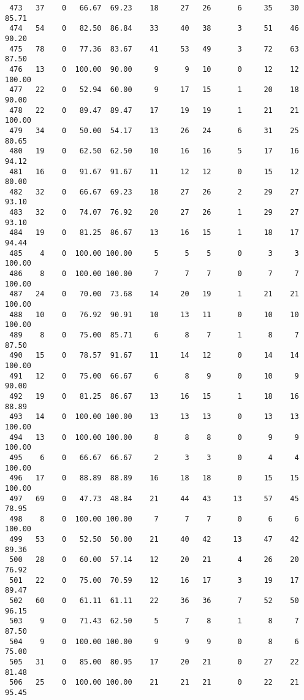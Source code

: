 \begin{verbatim}
 473   37    0   66.67  69.23    18     27   26      6     35    30    85.71
 474   54    0   82.50  86.84    33     40   38      3     51    46    90.20
 475   78    0   77.36  83.67    41     53   49      3     72    63    87.50
 476   13    0  100.00  90.00     9      9   10      0     12    12   100.00
 477   22    0   52.94  60.00     9     17   15      1     20    18    90.00
 478   22    0   89.47  89.47    17     19   19      1     21    21   100.00
 479   34    0   50.00  54.17    13     26   24      6     31    25    80.65
 480   19    0   62.50  62.50    10     16   16      5     17    16    94.12
 481   16    0   91.67  91.67    11     12   12      0     15    12    80.00
 482   32    0   66.67  69.23    18     27   26      2     29    27    93.10
 483   32    0   74.07  76.92    20     27   26      1     29    27    93.10
 484   19    0   81.25  86.67    13     16   15      1     18    17    94.44
 485    4    0  100.00 100.00     5      5    5      0      3     3   100.00
 486    8    0  100.00 100.00     7      7    7      0      7     7   100.00
 487   24    0   70.00  73.68    14     20   19      1     21    21   100.00
 488   10    0   76.92  90.91    10     13   11      0     10    10   100.00
 489    8    0   75.00  85.71     6      8    7      1      8     7    87.50
 490   15    0   78.57  91.67    11     14   12      0     14    14   100.00
 491   12    0   75.00  66.67     6      8    9      0     10     9    90.00
 492   19    0   81.25  86.67    13     16   15      1     18    16    88.89
 493   14    0  100.00 100.00    13     13   13      0     13    13   100.00
 494   13    0  100.00 100.00     8      8    8      0      9     9   100.00
 495    6    0   66.67  66.67     2      3    3      0      4     4   100.00
 496   17    0   88.89  88.89    16     18   18      0     15    15   100.00
 497   69    0   47.73  48.84    21     44   43     13     57    45    78.95
 498    8    0  100.00 100.00     7      7    7      0      6     6   100.00
 499   53    0   52.50  50.00    21     40   42     13     47    42    89.36
 500   28    0   60.00  57.14    12     20   21      4     26    20    76.92
 501   22    0   75.00  70.59    12     16   17      3     19    17    89.47
 502   60    0   61.11  61.11    22     36   36      7     52    50    96.15
 503    9    0   71.43  62.50     5      7    8      1      8     7    87.50
 504    9    0  100.00 100.00     9      9    9      0      8     6    75.00
 505   31    0   85.00  80.95    17     20   21      0     27    22    81.48
 506   25    0  100.00 100.00    21     21   21      0     22    21    95.45

\end{verbatim}
